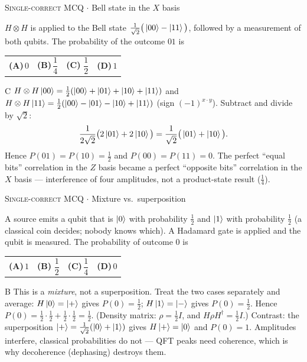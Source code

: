 \documentclass[11pt,a4paper]{article}
\newcommand{\optlabel}[1]{\textbf{(#1)}}
\newcommand{\correctlabel}[1]{\textcolor{okgreen}{\textbf{(#1)}\,\ding{51}}}
\newenvironment{qitem}[1]{\begin{list}{}{\setlength{\leftmargin}{3.3em}\setlength{\labelwidth}{3.1em}%
  \setlength{\labelsep}{0.2em}\setlength{\topsep}{3pt}\setlength{\parsep}{3pt}}\item[\textbf{Q.#1}\hfill]}{\end{list}}
\newcommand{\qsep}{\par\vspace{2pt}{\color{black!15}\hrule}\vspace{4pt}}
\newcommand{\qmeta}[2]{{\footnotesize\color{black!60}\textsc{#1} \;$\cdot$\; #2}\par}
\begin{document}
\begin{qitem}{33}
\qmeta{Single-correct MCQ}{Bell state in the $X$ basis}
$H\otimes H$ is applied to the Bell state $\frac{1}{\sqrt2}\big(\ket{00} - \ket{11}\big)$, followed by a measurement of both
qubits. The probability of the outcome $01$ is
\par\smallskip\noindent\begin{tabularx}{\linewidth}{@{}*{4}{L}@{}}
\optlabel{A}\,$0$ & \optlabel{B}\,$\dfrac14$ & \correctlabel{C}\,$\dfrac12$ & \optlabel{D}\,$1$
\end{tabularx}
\end{qitem}
\begin{solbox}{C}
$H\otimes H\ket{00} = \frac12(\ket{00} + \ket{01} + \ket{10} + \ket{11})$ and
$H\otimes H\ket{11} = \frac12(\ket{00} - \ket{01} - \ket{10} + \ket{11})$ (sign $(-1)^{x\cdot y}$). Subtract and divide by $\sqrt2$:
\[ \frac{1}{2\sqrt2}\big(2\ket{01} + 2\ket{10}\big) = \frac{1}{\sqrt2}\big(\ket{01} + \ket{10}\big). \]
Hence $P(01) = P(10) = \frac12$ and $P(00) = P(11) = 0$. The perfect ``equal bits'' correlation in the $Z$ basis became a
perfect ``opposite bits'' correlation in the $X$ basis --- interference of four amplitudes, not a product-state result
($\frac14$).
\end{solbox}
\qsep

\begin{qitem}{34}
\qmeta{Single-correct MCQ}{Mixture vs.\ superposition}
A source emits a qubit that is $\ket0$ with probability $\frac12$ and $\ket1$ with probability $\frac12$ (a classical
coin decides; nobody knows which). A Hadamard gate is applied and the qubit is measured. The probability of outcome $0$ is
\par\smallskip\noindent\begin{tabularx}{\linewidth}{@{}*{4}{L}@{}}
\optlabel{A}\,$1$ & \correctlabel{B}\,$\dfrac12$ & \optlabel{C}\,$\dfrac14$ & \optlabel{D}\,$0$
\end{tabularx}
\end{qitem}
\begin{solbox}{B}
This is a \emph{mixture}, not a superposition. Treat the two cases separately and average:
$H\ket0 = \ket{+}$ gives $P(0) = \frac12$; $H\ket1 = \ket{-}$ gives $P(0) = \frac12$. Hence $P(0) = \frac12\cdot\frac12 + \frac12\cdot\frac12 = \frac12$.
(Density matrix: $\rho = \frac12 I$, and $H\rho H^\dagger = \frac12 I$.) Contrast: the superposition
$\ket{+} = \frac{1}{\sqrt2}(\ket0 + \ket1)$ gives $H\ket{+} = \ket0$ and $P(0) = 1$. Amplitudes interfere, classical probabilities do
not --- QFT peaks need coherence, which is why decoherence (dephasing) destroys them.
\end{solbox}
\qsep
\end{document}
